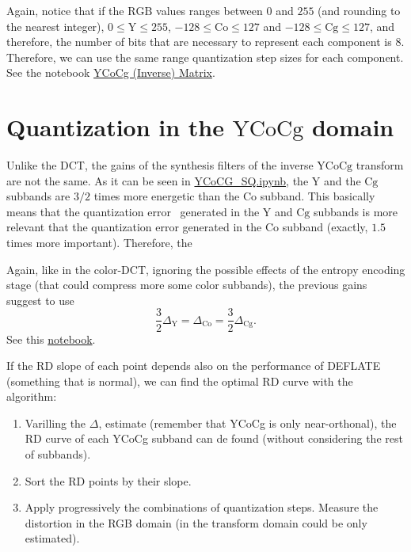 Again, notice that if the $\text{RGB}$ values ranges between $0$ and
$255$ (and rounding to the nearest integer), $0\le\text{Y}\le 255$,
$-128\le\text{Co}\le 127$ and $-128\le\text{Cg}\le 127$, and
therefore, the number of bits that are necessary to represent each
component is $8$. Therefore, we can use the same range quantization
step sizes for each component. See the notebook
\href{https://github.com/vicente-gonzalez-ruiz/color_transforms/blob/main/docs/YCoCg/notebooks/YCoCg_matrix.ipynb}{YCoCg
  (Inverse) Matrix}.


\section{Quantization in the $\text{YCoCg}$ domain}
Unlike the DCT, the gains of the synthesis filters of the inverse
$\text{YCoCg}$ transform are not the same. As it can be seen in
\href{https://github.com/Sistemas-Multimedia/Sistemas-Multimedia.github.io/blob/master/contents/YCoCg_SQ/YCoCG_SQ.ipynb}{YCoCG\_SQ.ipynb},
the $\text{Y}$ and the $\text{Cg}$ subbands are $3/2$ times more
energetic than the $\text{Co}$ subband. This basically means that the
quantization error~\cite{vruiz__signal_quantization} generated in the
$\text{Y}$ and $\text{Cg}$ subbands is more relevant that the
quantization error generated in the $\text{Co}$ subband (exactly,
$1.5$ times more important). Therefore, the 

Again, like in the color-DCT, ignoring the possible effects of the
entropy encoding stage (that could compress more some color subbands),
the previous gains suggest to use
\begin{equation}
  \frac{3}{2}\Delta_{\text{Y}} = \Delta_{\text{Co}} = \frac{3}{2}\Delta_{\text{Cg}}.
\end{equation}
See this \href{https://github.com/Sistemas-Multimedia/Sistemas-Multimedia.github.io/blob/master/milestones/06-YUV_compression/YCrCb_matrix.ipynb}{notebook}.

If the RD slope of each point depends also on the performance of DEFLATE (something that is normal), we can find the optimal RD curve with the algorithm:
\begin{enumerate}
\item Varilling the $\Delta$, estimate (remember that YCoCg is only  near-orthonal), the RD curve of each YCoCg subband can de found (without considering the rest of subbands).
\item Sort the RD points by their slope.
\item Apply progressively the combinations of quantization
  steps. Measure the distortion in the RGB domain (in the transform
  domain could be only estimated).
\end{enumerate}

